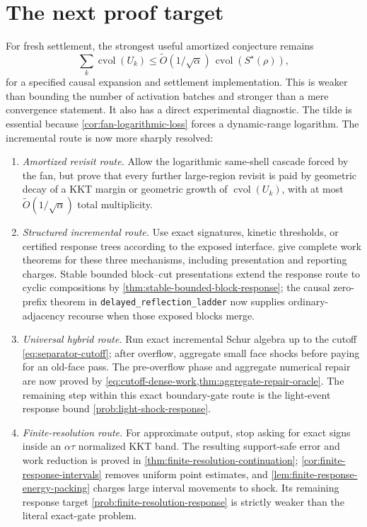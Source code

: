 \section{The next proof target}
\label{sec:next-target}

For fresh settlement, the strongest useful amortized conjecture remains
\begin{equation}
 \sum_k\operatorname{cvol}(U_k)
 \leq
 \widetilde O(1/\sqrt\alpha)\,
 \operatorname{cvol}(S^\star(\rho)),
 \label{eq:core-revisit-conjecture}
\end{equation}
for a specified causal expansion and settlement implementation.  This is
weaker than bounding the number of activation batches and stronger than a
mere convergence statement.  It also has a direct experimental diagnostic.
The tilde is essential because \cref{cor:fan-logarithmic-loss} forces a
dynamic-range logarithm.  The incremental route is now more sharply resolved:
\begin{enumerate}[leftmargin=*]
 \item \emph{Amortized revisit route.}  Allow the logarithmic same-shell
 cascade forced by the fan, but prove that every further large-region revisit
 is paid by geometric decay of a KKT margin or geometric growth of
 $\operatorname{cvol}(U_k)$, with at most
 $\widetilde O(1/\sqrt\alpha)$ total multiplicity.
 \item \emph{Structured incremental route.}  Use exact signatures, kinetic
 thresholds, or certified response trees according to the exposed interface.
 give complete work theorems for these three
 mechanisms, including presentation and reporting charges.  Stable bounded
 block--cut presentations extend the response route to cyclic compositions
 by \cref{thm:stable-bounded-block-response}; the causal zero-prefix theorem
 in \texttt{delayed\_reflection\_ladder} now supplies ordinary-adjacency
 recourse when those exposed blocks merge.
 \item \emph{Universal hybrid route.}  Run exact incremental Schur algebra up
 to the cutoff \cref{eq:separator-cutoff}; after overflow, aggregate small
 face shocks before paying for an old-face pass.  The pre-overflow phase and
 aggregate numerical repair are now proved by
 \cref{eq:cutoff-dense-work,thm:aggregate-repair-oracle}.  The remaining step
 within this exact boundary-gate route is the light-event response bound
 \cref{prob:light-shock-response}.
 \item \emph{Finite-resolution route.}  For approximate output, stop asking
 for exact signs inside an $\alpha\tau$ normalized KKT band.  The resulting
 support-safe error and work reduction is proved in
 \cref{thm:finite-resolution-continuation};
 \cref{cor:finite-response-intervals} removes uniform point estimates, and
 \cref{lem:finite-response-energy-packing} charges large interval movements
 to shock.  Its remaining response target
 \cref{prob:finite-resolution-response} is strictly weaker than the literal
 exact-gate problem.
\end{enumerate}

